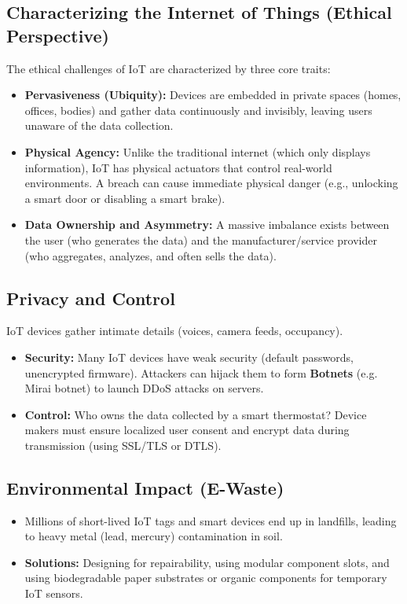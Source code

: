 \documentclass[12pt,a4paper]{article}
\begin{document}
\subsection{Characterizing the Internet of Things (Ethical Perspective)}
The ethical challenges of IoT are characterized by three core traits:
\begin{itemize}[leftmargin=*, itemsep=3.0pt]
  \item \textbf{Pervasiveness (Ubiquity):} Devices are embedded in private spaces (homes, offices, bodies) and gather data continuously and invisibly, leaving users unaware of the data collection.
  \item \textbf{Physical Agency:} Unlike the traditional internet (which only displays information), IoT has physical actuators that control real-world environments. A breach can cause immediate physical danger (e.g., unlocking a smart door or disabling a smart brake).
  \item \textbf{Data Ownership and Asymmetry:} A massive imbalance exists between the user (who generates the data) and the manufacturer/service provider (who aggregates, analyzes, and often sells the data).
\end{itemize}

\subsection{Privacy and Control}
IoT devices gather intimate details (voices, camera feeds, occupancy).
\begin{itemize}[leftmargin=*, itemsep=2.5pt]
  \item \textbf{Security:} Many IoT devices have weak security (default passwords, unencrypted firmware). Attackers can hijack them to form \textbf{Botnets} (e.g. Mirai botnet) to launch DDoS attacks on servers.
  \item \textbf{Control:} Who owns the data collected by a smart thermostat? Device makers must ensure localized user consent and encrypt data during transmission (using SSL/TLS or DTLS).
\end{itemize}

\subsection{Environmental Impact (E-Waste)}
\begin{itemize}[leftmargin=*, itemsep=3pt]
  \item Millions of short-lived IoT tags and smart devices end up in landfills, leading to heavy metal (lead, mercury) contamination in soil.
  \item \textbf{Solutions:} Designing for repairability, using modular component slots, and using biodegradable paper substrates or organic components for temporary IoT sensors.
\end{itemize}
\end{document}
